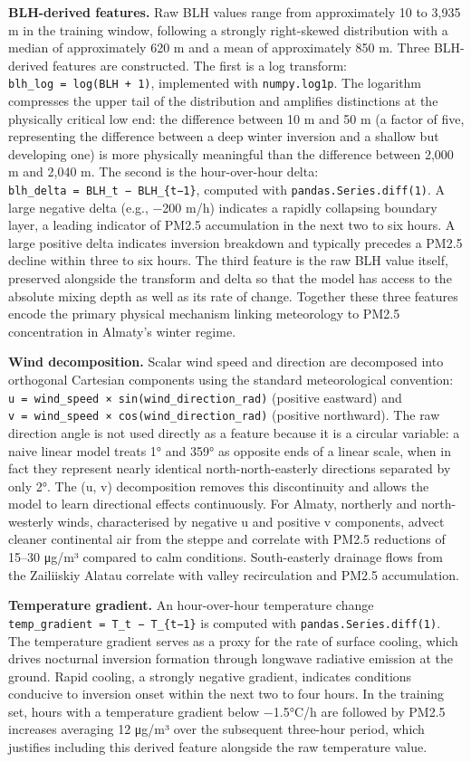 \textbf{BLH-derived features.} Raw BLH values range from approximately 10 to 3,935 m in the training window, following a strongly right-skewed distribution with a median of approximately 620 m and a mean of approximately 850 m. Three BLH-derived features are constructed. The first is a log transform: \texttt{blh\_log\ =\ log(BLH\ +\ 1)}, implemented with \texttt{numpy.log1p}. The logarithm compresses the upper tail of the distribution and amplifies distinctions at the physically critical low end: the difference between 10 m and 50 m (a factor of five, representing the difference between a deep winter inversion and a shallow but developing one) is more physically meaningful than the difference between 2,000 m and 2,040 m. The second is the hour-over-hour delta: \texttt{blh\_delta\ =\ BLH\_t\ −\ BLH\_\{t−1\}}, computed with \texttt{pandas.Series.diff(1)}. A large negative delta (e.g., −200 m/h) indicates a rapidly collapsing boundary layer, a leading indicator of PM2.5 accumulation in the next two to six hours. A large positive delta indicates inversion breakdown and typically precedes a PM2.5 decline within three to six hours. The third feature is the raw BLH value itself, preserved alongside the transform and delta so that the model has access to the absolute mixing depth as well as its rate of change. Together these three features encode the primary physical mechanism linking meteorology to PM2.5 concentration in Almaty's winter regime.

\textbf{Wind decomposition.} Scalar wind speed and direction are decomposed into orthogonal Cartesian components using the standard meteorological convention: \texttt{u\ =\ wind\_speed\ ×\ sin(wind\_direction\_rad)} (positive eastward) and \texttt{v\ =\ wind\_speed\ ×\ cos(wind\_direction\_rad)} (positive northward). The raw direction angle is not used directly as a feature because it is a circular variable: a naive linear model treats 1° and 359° as opposite ends of a linear scale, when in fact they represent nearly identical north-north-easterly directions separated by only 2°. The (u, v) decomposition removes this discontinuity and allows the model to learn directional effects continuously. For Almaty, northerly and north-westerly winds, characterised by negative u and positive v components, advect cleaner continental air from the steppe and correlate with PM2.5 reductions of 15--30 μg/m³ compared to calm conditions. South-easterly drainage flows from the Zailiiskiy Alatau correlate with valley recirculation and PM2.5 accumulation.

\textbf{Temperature gradient.} An hour-over-hour temperature change \texttt{temp\_gradient\ =\ T\_t\ −\ T\_\{t−1\}} is computed with \texttt{pandas.Series.diff(1)}. The temperature gradient serves as a proxy for the rate of surface cooling, which drives nocturnal inversion formation through longwave radiative emission at the ground. Rapid cooling, a strongly negative gradient, indicates conditions conducive to inversion onset within the next two to four hours. In the training set, hours with a temperature gradient below −1.5°C/h are followed by PM2.5 increases averaging 12 μg/m³ over the subsequent three-hour period, which justifies including this derived feature alongside the raw temperature value.

